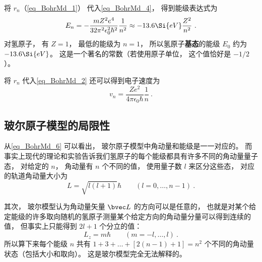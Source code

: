 将 $r_n$（\autoref{eq_BohrMd_1}） 代入\autoref{eq_BohrMd_4}， 得到能级表达式为
\begin{equation}\label{eq_BohrMd_11}
E_n =  - \frac{mZ^2 e^4}{32\pi^2\epsilon_0^2 \hbar ^2} \frac{1}{n^2} \approx  - 13.6\Si{eV}\frac{Z^2}{n^2}~.
\end{equation}
对氢原子， 有 $Z = 1$， 最低的能级为 $n = 1$， 所以氢原子\textbf{基态}的能级 $E_0$ 约为 $-13.6\Si{eV}$。 这是一个著名的常数（若使用原子单位， 这个值恰好是 $-1/2$）。

将 $r_n$ 代入\autoref{eq_BohrMd_2} 还可以得到电子速度为
\begin{equation}\label{eq_BohrMd_10}
v_n = \frac{Z e^2}{4\pi\epsilon_0\hbar} \frac{1}{n}~.
\end{equation}

\subsection{玻尔原子模型的局限性}
从\autoref{eq_BohrMd_6} 可以看出， 玻尔原子模型中角动量和能级是一一对应的。 而事实上现代的理论和实验告诉我们氢原子的每个能级都具有许多不同的角动量量子态， 对给定的 $n$， 角动量有 $n$ 个不同的值， 使用量子数 $l$ 来区分这些态， 对应的轨道角动量大小为
\begin{equation}
L = \sqrt{l(l+1)}\hbar \qquad (l = 0,\dots,n-1)~.
\end{equation}

其次， 玻尔模型认为角动量矢量 $\bvec L$ 的方向可以是任意的， 也就是对某个给定能级的许多取向随机的氢原子测量某个给定方向的角动量分量可以得到连续的值， 但事实上只能得到 $2l+1$ 个分立的值：
\begin{equation}
L_z = m\hbar \qquad (m = -l,\dots,l)~.
\end{equation}
所以算下来每个能级 $n$ 共有 $1+3+\dots+[2(n-1)+1] = n^2$ 个不同的角动量状态（包括大小和取向）。 这是玻尔模型完全无法解释的。


